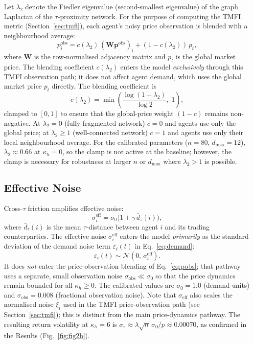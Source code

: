 \documentclass[10pt,twocolumn]{article}
\begin{document}
Let $\lambda_2$ denote the Fiedler eigenvalue (second-smallest eigenvalue)
of the graph Laplacian of the $\tau$-proximity network.
For the purpose of computing the TMFI metric (Section~\ref{sec:tmfi}),
each agent's noisy price observation is blended with a neighbourhood average:
\begin{equation}
  p^{\mathrm{obs}}_i = c(\lambda_2)\,(\mathbf{W}\mathbf{p}^{\mathrm{obs}})_i
                     + (1 - c(\lambda_2))\,p_t,
  \label{eq:pobs}
\end{equation}
where $\mathbf{W}$ is the row-normalised adjacency matrix and $p_t$ is the
global market price.
The blending coefficient $c(\lambda_2)$ enters the model \emph{exclusively}
through this TMFI observation path; it does not affect agent demand, which
uses the global market price $p_t$ directly.
The blending coefficient is
\begin{equation}
  c(\lambda_2) = \min\!\left(\frac{\log(1+\lambda_2)}{\log 2},\;1\right),
  \label{eq:clam}
\end{equation}
clamped to $[0,1]$ to ensure that the global-price weight $(1-c)$ remains
non-negative.
At $\lambda_2 = 0$ (fully fragmented network) $c = 0$ and agents use only
the global price; at $\lambda_2 \geq 1$ (well-connected network) $c = 1$
and agents use only their local neighbourhood average.
For the calibrated parameters ($n=80$, $d_{\max}=12$),
$\lambda_2 \approx 0.66$ at $\kappa_h = 0$, so the clamp is not active at
the baseline; however, the clamp is necessary for robustness at larger $n$
or $d_{\max}$ where $\lambda_2 > 1$ is possible.

\subsection{Effective Noise}
\label{sec:noise}

Cross-$\tau$ friction amplifies effective noise:
\begin{equation}
  \sigma_i^{\mathrm{eff}} = \sigma_0\bigl(1 + \gamma\,\bar{d}_\tau(i)\bigr),
  \label{eq:sigeff}
\end{equation}
where $\bar{d}_\tau(i)$ is the mean $\tau$-distance between agent $i$ and
its trading counterparties.
The effective noise $\sigma_i^{\mathrm{eff}}$ enters the model
\emph{primarily} as the standard deviation of the demand noise term
$\varepsilon_i(t)$ in Eq.~\eqref{eq:demand}:
\[
  \varepsilon_i(t) \sim \mathcal{N}\!\left(0,\,\sigma_i^{\mathrm{eff}}\right).
\]
It does \emph{not} enter the price-observation blending of
Eq.~\eqref{eq:pobs}; that pathway uses a separate, small observation noise
$\sigma_{\mathrm{obs}} \ll \sigma_0$ so that the price dynamics remain
bounded for all $\kappa_h \geq 0$.
The calibrated values are $\sigma_0 = 1.0$ (demand units) and
$\sigma_{\mathrm{obs}} = 0.008$ (fractional observation noise).
Note that $\sigma_{\mathrm{eff}}$ also scales the normalised noise $\xi_i$ used in the TMFI price-observation path (see Section~\ref{sec:tmfi}); this is distinct from the main price-dynamics pathway.
The resulting return volatility at $\kappa_h = 6$ is
$\sigma_r \approx \lambda\sqrt{n}\,\sigma_0/p \approx 0.00070$,
as confirmed in the Results (Fig.~\ref{fig:fig2b}).
\end{document}
